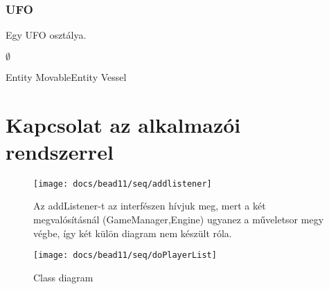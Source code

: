 \documentclass[../../projlab]{subfiles}
\begin{document}
\subsubsection{UFO}
\begin{class-template-responsibility}
    Egy UFO osztálya. 
\end{class-template-responsibility}
\begin{class-template-interface}
    $\emptyset$
\end{class-template-interface}
\begin{class-template-baseclass}
    Entity \baseclass MovableEntity \baseclass Vessel
\end{class-template-baseclass}
\begin{class-template-attribute}
\end{class-template-attribute}
\begin{class-template-method}
\end{class-template-method}

\section{Kapcsolat az alkalmazói rendszerrel}
\begin{figure}[H] 
    \centering 
    \texttt{[image: docs/bead11/seq/addlistener]} 
    \caption{Az addListener-t az interfészen hívjuk meg, mert a két megvalósításnál (GameManager,Engine) ugyanez a műveletsor megy végbe, így két külön diagram nem készült róla.} 
\end{figure} 

\begin{figure}[H] 
    \centering 
    \texttt{[image: docs/bead11/seq/doPlayerList]} 
    \caption{Class diagram} 
\end{figure} 
\end{document}
